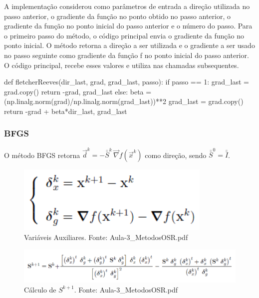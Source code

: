 \documentclass[10pt, a4paper]{article}
\begin{document}
A implementação considerou como parâmetros de entrada a direção utilizada no passo anterior, o gradiente da função no ponto obtido no passo anterior, o gradiente 
da função no ponto inicial do passo anterior e o número do passo. Para o primeiro passo do método, o código principal envia o gradiente da função no ponto inicial.
O método retorna a direção a ser utilizada e o gradiente a ser usado no passo seguinte como gradiente da função f no ponto inicial do passo anterior. O código principal,
recebe esses valores e utiliza nas chamadas subsequentes.

\begin{python}
 def fletcherReeves(dir_last, grad, grad_last, passo):
    if passo == 1:
        grad_last = grad.copy()
        return -grad, grad_last
    else:
        beta = (np.linalg.norm(grad)/np.linalg.norm(grad_last))**2
        grad_last = grad.copy()
        return -grad + beta*dir_last, grad_last
\end{python}

\subsubsection{BFGS}

O método BFGS retorna $\overrightarrow{d}^k = -\bar{\bar{S}}^k\,\overrightarrow{\nabla}f(\overrightarrow{x}^k)$ como direção,
sendo $\bar{\bar{S}}^0 = \bar{\bar{I}}$.

\begin{figure}[htpb]
  \centering
  \includegraphics[scale=0.5]{figuras/bfgs_auxiliares.PNG}
  \caption{Variáveis Auxiliares. Fonte: Aula-3\_MetodosOSR.pdf}
\end{figure}

\begin{figure}[htpb]
  \centering
  \includegraphics[scale=0.5]{figuras/bfgs_sk.PNG}
  \caption{Cálculo de $S^{k+1}$. Fonte: Aula-3\_MetodosOSR.pdf}
\end{figure}
\end{document}
